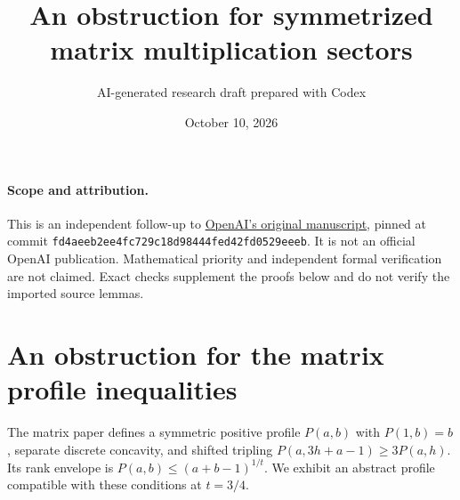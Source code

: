 \documentclass[11pt]{article}
\title{An obstruction for symmetrized matrix multiplication sectors}
\author{AI-generated research draft prepared with Codex}
\date{October 10, 2026}
\begin{document}
\maketitle
\paragraph{Scope and attribution.}
This is an independent follow-up to
\href{https://github.com/openai/math/tree/fd4aeeb2ee4fc729c18d98444fed42fd0529eeeb/preprints/Matrix-Multiplication-Nine-Fourths-October-2-2026}{OpenAI's original manuscript},
pinned at commit \texttt{fd4aeeb2ee4fc729c18d98444fed42fd0529eeeb}.
It is not an official OpenAI publication. Mathematical priority and
independent formal verification are not claimed. Exact checks supplement
the proofs below and do not verify the imported source lemmas.
\section{An obstruction for the matrix profile inequalities}
The matrix paper defines a symmetric positive profile $P(a,b)$ with
$P(1,b)=b$, separate discrete concavity, and shifted tripling
$P(a,3h+a-1)\ge3P(a,h)$. Its rank envelope is
$P(a,b)\le(a+b-1)^{1/t}$. We exhibit an abstract profile compatible with
these conditions at $t=3/4$.
\end{document}
